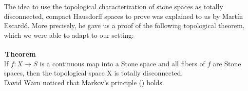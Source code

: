 The idea to use the topological characterization of stone spaces as totally disconnected, compact Hausdorff spaces to prove  was explained to us by Martín Escardó. More precisely, he gave us a proof of the following topological theorem, which we were able to adapt to our setting:\\
~\\
\,\textbf{Theorem}\\
  If $f : X \to S$ is a continuous map into a Stone space and all fibers of $f$ are Stone spaces, then the topological space X is totally disconnected. \\

David Wärn noticed that Markov's principle () holds. 
